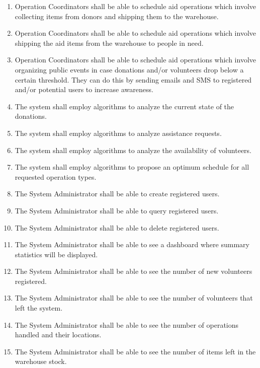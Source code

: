 \documentclass[a4paper,12pt]{report}
\begin{document}
\begin{enumerate}
			\item Operation Coordinators shall be able to schedule aid operations which involve collecting items from donors and shipping them to the warehouse.
			
			\item Operation Coordinators shall be able to schedule aid operations which involve shipping the aid items from the warehouse to people in need.
			
			\item  Operation Coordinators shall be able to schedule aid operations which involve organizing public events in case donations and/or volunteers drop below a certain threshold. They can do this by sending emails and SMS to registered and/or potential users to increase awareness.
			
			\item The system shall employ algorithms to analyze the current state of the donations.
			
			\item The system shall employ algorithms to analyze assistance requests.
			
			\item The system shall employ algorithms to analyze the availability of volunteers.
			
			\item The system shall employ algorithms to propose an optimum schedule for all requested operation types.
			
			\item The System Administrator shall be able to create registered users.
			
			\item The System Administrator shall be able to query registered users.
			
			\item The System Administrator shall be able to delete registered users.
			
			\item The System Administrator shall be able to see a dashboard where summary statistics will be displayed. 
			
			\item The System Administrator shall be able to see the number of new volunteers registered.
			
			\item The System Administrator shall be able to see the number of volunteers that left the system.
			\item The System Administrator shall be able to see the number of operations handled and their locations.
			
			\item The System Administrator shall be able to see the number of items left in the warehouse stock.
			
		
		
	\end{enumerate}
\end{document}
